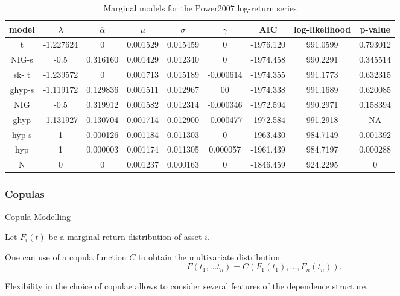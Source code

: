 {\tiny

\begin{table}[ht]
            \vspace{0.5cm}
                \begin{tabular}{c|c|c|c|c|c|c|c|c}
                    model&$\lambda$&$\overline{\alpha}$&$\mu$&$\sigma$&$\gamma$&AIC&log-likelihood&p-value\\\hline
                    t&-1.227624&0&0.001529&0.015459&0&-1976.120&991.0599&0.793012\\
                    NIG-s&-0.5&0.316160&0.001429&0.012340&0&-1974.458&990.2291&0.345514\\
                    sk- t&-1.239572&0&0.001713&0.015189&-0.000614&-1974.355&991.1773&0.632315\\
                    ghyp-s&-1.119172&0.129836&0.001511&0.012967&00&-1974.338&991.1689&0.620085\\
                    NIG&-0.5&0.319912&0.001582&0.012314&-0.000346&-1972.594&990.2971&0.158394\\
                    ghyp&-1.131927&0.130704&0.001714&0.012900&-0.000477&-1972.584&991.2918&NA\\
                    hyp-s&1&0.000126&0.001184&0.011303&0&-1963.430&984.7149&0.001392\\
                    hyp&1&0.000003&0.001174&0.011305&0.000057&-1961.439&984.7197&0.000288\\
                    N &0&0&0.001237&0.000163&0&-1846.459&924.2295&0
                \end{tabular}
                \caption{Marginal models for the Power2007 log-return series}
        \end{table}
}


\subsubsection{Copulas}

{Copula Modelling}

Let $F_i(t)$ be a marginal return distribution
of asset $i$.

One can use of a copula function $C$ to obtain the multivariate
 distribution
$$
F(t_1, \ldots t_n)=C(F_1(t_1),\ldots,F_n(t_n)).
$$

Flexibility in the choice of copulae allows to consider several
features of the dependence
structure.





